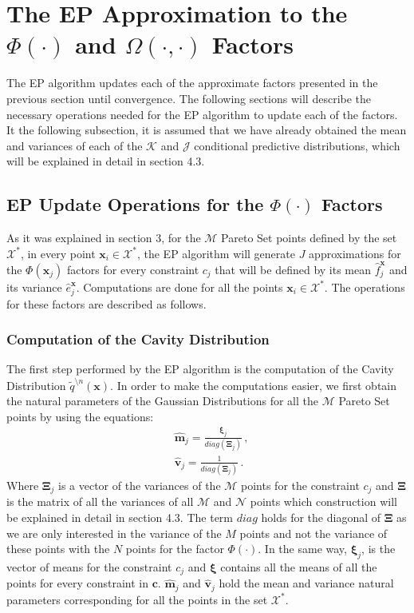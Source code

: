 \section{The EP Approximation to the $\Phi(\cdot)$ and $\Omega(\cdot,\cdot)$ Factors}

The EP algorithm updates each of the approximate factors presented in the previous section until convergence. The following sections will describe the necessary operations needed for the EP algorithm to update each of the factors. It the following subsection, it is assumed that we have already obtained the mean and variances of each of the $\mathcal{K}$ and $\mathcal{J}$ conditional predictive distributions, which will be explained in detail in section 4.3.

\subsection{EP Update Operations for the $\Phi(\cdot)$ Factors}

As it was explained in section 3, for the $\mathcal{M}$ Pareto Set points defined by the set $\mathcal{X}^*$, in every point $\boldsymbol{x}_i \in \mathcal{X}^*$, the EP algorithm will generate $J$ approximations for the $\Phi(\boldsymbol{x}_j)$ factors for every constraint $c_j$ that will be defined by its mean $\hat{f}_{j}^{\boldsymbol{x}}$ and its variance $\hat{e}_{j}^{\boldsymbol{x}}$. Computations are done for all the points $\boldsymbol{x}_i \in \mathcal{X}^*$. The operations for these factors are described as follows.

\subsubsection{Computation of the Cavity Distribution}

The first step performed by the EP algorithm is the computation of the Cavity Distribution $\tilde{q}^{\setminus n}(\boldsymbol{x})$. In order to make the computations easier, we first obtain the natural parameters of the Gaussian Distributions for all the $\mathcal{M}$ Pareto Set points by using the equations:
\begin{align}
& \boldsymbol{\hat{m}}_{j} = \frac{\boldsymbol{\xi}_j}{diag(\boldsymbol{\Xi}_j)}\,, \nonumber \\
& \boldsymbol{\hat{v}}_{j} = \frac{1}{diag(\boldsymbol{\Xi}_j)}\,.
\end{align}
Where $\boldsymbol{\Xi}_j$ is a vector of the variances of the $\mathcal{M}$ points for the constraint $c_j$ and $\boldsymbol{\Xi}$ is the matrix of all the variances of all $\mathcal{M}$ and $\mathcal{N}$ points which construction will be explained in detail in section 4.3. The term $diag$ holds for the diagonal of $\boldsymbol{\Xi}$ as we are only interested in the variance of the $M$ points and not the variance of these points with the $N$ points for the factor $\Phi(\cdot)$. In the same way, $\boldsymbol{\xi}_j$, is the vector of means for the constraint $c_j$ and $\boldsymbol{\xi}$ contains all the means of all the points for every constraint in $\boldsymbol{c}$. $\boldsymbol{\hat{m}}_{j}$ and $\boldsymbol{\hat{v}}_{j}$ hold the mean and variance natural parameters corresponding for all the points in the set $\mathcal{X}^*$.

